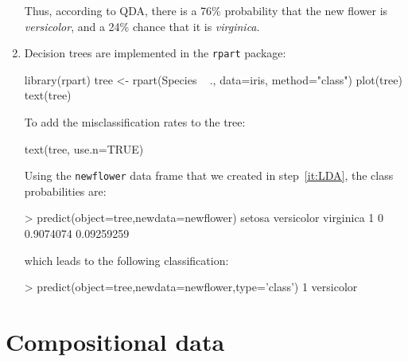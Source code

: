\begin{enumerate}
Thus, according to QDA, there is a 76\% probability that the new
flower is \textit{versicolor}, and a 24\% chance that it is
\textit{virginica}.

\item Decision trees are implemented in the \texttt{rpart} package:

\begin{script}
library(rpart)
tree <- rpart(Species ~ ., data=iris, method="class")
plot(tree)
text(tree)
\end{script}

To add the misclassification rates to the tree:

\begin{script}[firstnumber=4]
text(tree, use.n=TRUE)
\end{script}

Using the \texttt{newflower} data frame that we created in
step~\ref{it:LDA}, the class probabilities are:

\begin{console}
> predict(object=tree,newdata=newflower)
  setosa versicolor  virginica
1      0  0.9074074 0.09259259
\end{console}

\noindent which leads to the following classification:

\begin{console}
> predict(object=tree,newdata=newflower,type='class')
         1 
versicolor 
\end{console}

\end{enumerate}
  
\section{Compositional data}
\label{sec:R-compositional}

